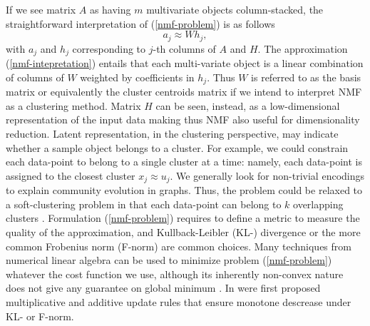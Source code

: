 \documentclass[runningheads]{llncs}
\begin{document}
If we see matrix $A$ as having $m$ multivariate objects column-stacked, the straightforward interpretation of (\ref{nmf-problem}) is as follows
\begin{equation}\label{nmf-intepretation}
	a_j \approx W h_j,
\end{equation}
with $a_j$ and $h_j$ corresponding to $j$-th columns of $A$ and $H$.  The approximation (\ref{nmf-intepretation}) entails that each multi-variate object is a linear combination of columns of $W$ weighted by coefficients in $h_j$. Thus $W$ is referred to as the basis matrix or equivalently the cluster centroids matrix if we intend to interpret NMF as a clustering method. Matrix $H$ can be seen, instead, as a low-dimensional representation of the input data making thus NMF also useful for dimensionality reduction. Latent representation, in the clustering perspective, may indicate whether a sample object belongs to a cluster. For example, we could constrain each data-point to belong to a single cluster at a time: namely, each data-point is assigned to the closest cluster $x_j \approx u_j$. We generally look for non-trivial encodings to explain community evolution in graphs. Thus, the problem could be relaxed to a soft-clustering problem in that each data-point can belong to $k$ overlapping clusters \cite{Watt:2016:MLR:3126125}.  Formulation (\ref{nmf-problem}) requires to define a metric to measure the quality of the approximation, and  Kullback-Leibler (KL-) divergence or the more common Frobenius norm (F-norm) are common choices.
Many techniques from numerical linear algebra can be used to minimize problem (\ref{nmf-problem}) whatever the cost function we use, although its inherently non-convex nature does not give any guarantee on global minimum \cite{2019arXiv190301321F}. In  \cite{NIPS2000_1861} were first proposed multiplicative and additive update rules that ensure monotone descrease under KL- or F-norm.
\end{document}

